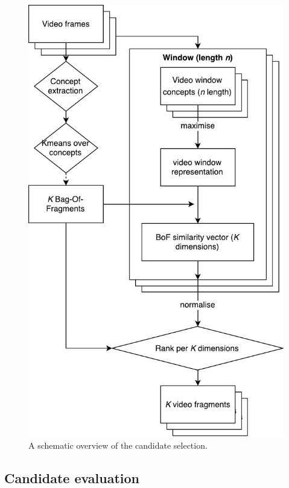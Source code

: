 \documentclass{../resources/sig-alternate-05-2015}
\begin{document}

\begin{figure}[h]
  \label{candidate selection scheme}
  \includegraphics[width=\linewidth]{resources/candidate-selection}
  \caption{A schematic overview of the candidate selection.}
\end{figure}

\subsection{Candidate evaluation}
\label{candidate evaluation}
\end{document}
